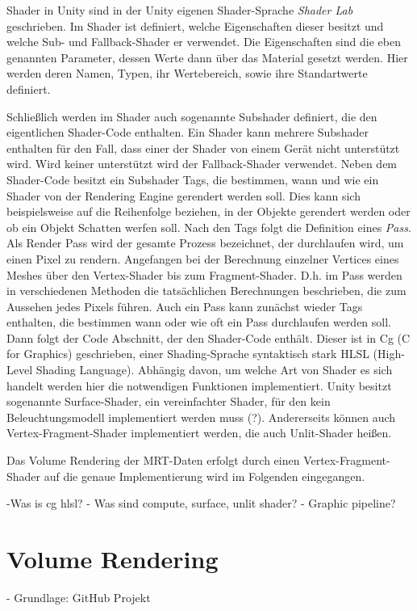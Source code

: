 Shader in Unity sind in der Unity eigenen Shader-Sprache \textit{Shader Lab} geschrieben. Im Shader ist definiert, welche Eigenschaften dieser besitzt und welche Sub- und Fallback-Shader er verwendet.
Die Eigenschaften sind die eben genannten Parameter, dessen Werte dann über das Material gesetzt werden. Hier werden deren Namen, Typen, ihr Wertebereich, sowie ihre Standartwerte definiert. 

Schließlich werden im Shader auch sogenannte Subshader definiert, die den eigentlichen Shader-Code enthalten.
Ein Shader kann mehrere Subshader enthalten für den Fall, dass einer der Shader von einem Gerät nicht unterstützt wird. Wird keiner unterstützt wird der Fallback-Shader verwendet. 
Neben dem Shader-Code besitzt ein Subshader Tags, die bestimmen, wann und wie ein Shader von der Rendering Engine gerendert werden soll. Dies kann sich beispielsweise auf die Reihenfolge beziehen, in der Objekte gerendert werden oder ob ein Objekt Schatten werfen soll. 
Nach den Tags folgt die Definition eines \textit{Pass}. Als Render Pass wird der gesamte Prozess bezeichnet, der durchlaufen wird, um einen Pixel zu rendern. Angefangen bei der Berechnung einzelner Vertices eines Meshes über den Vertex-Shader bis zum Fragment-Shader. D.h. im Pass werden in verschiedenen Methoden die tatsächlichen Berechnungen beschrieben, die zum Aussehen jedes Pixels führen. 
Auch ein Pass kann zunächst wieder Tags enthalten, die bestimmen wann oder wie oft ein Pass durchlaufen werden soll. 
Dann folgt der Code Abschnitt, der den Shader-Code enthält. Dieser ist in Cg (C for Graphics) geschrieben, einer Shading-Sprache syntaktisch stark HLSL (High-Level Shading Language). 
Abhängig davon, um welche Art von Shader es sich handelt werden hier die notwendigen Funktionen implementiert. Unity besitzt sogenannte Surface-Shader, ein vereinfachter Shader, für den kein Beleuchtungsmodell implementiert werden muss (?). Andererseits können auch Vertex-Fragment-Shader implementiert werden, die auch Unlit-Shader heißen. 

Das Volume Rendering der MRT-Daten erfolgt durch einen Vertex-Fragment-Shader auf die genaue Implementierung wird im Folgenden eingegangen. 

-Was is cg hlsl?
- Was sind compute, surface, unlit shader?
- Graphic pipeline?


\section{Volume Rendering}
- Grundlage: GitHub Projekt

